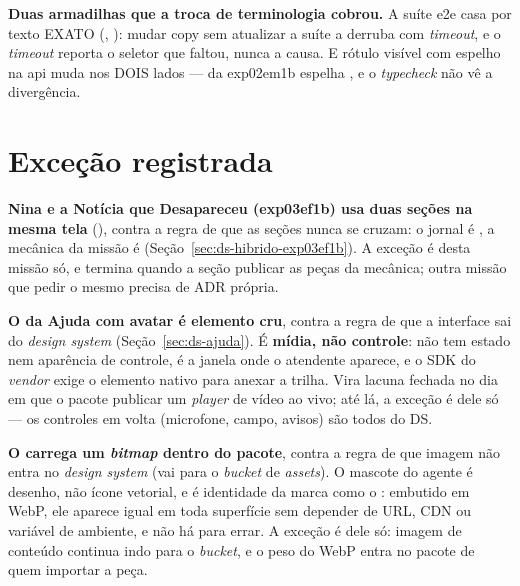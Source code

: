 \textbf{Duas armadilhas que a troca de terminologia cobrou.} A suíte e2e casa por
texto EXATO (, ): mudar copy sem atualizar
a suíte a derruba com \emph{timeout}, e o \emph{timeout} reporta o seletor que
faltou, nunca a causa. E rótulo visível com espelho na api muda nos DOIS lados
---  da exp02em1b espelha
, e o \emph{typecheck} não vê a
divergência.

\section{Exceção registrada}

\begin{decisao}
\textbf{Nina e a Notícia que Desapareceu (exp03ef1b) usa duas seções na mesma
tela} (), contra a regra de que as seções nunca se cruzam: o
jornal é , a mecânica da missão é 
(Seção~\ref{sec:ds-hibrido-exp03ef1b}). A exceção é desta missão só, e
termina quando a seção  publicar as peças da mecânica; outra
missão que pedir o mesmo precisa de ADR própria.
\end{decisao}

\begin{decisao}
\textbf{O  da Ajuda com avatar é elemento cru}, contra a regra de
que a interface sai do \emph{design system} (Seção~\ref{sec:ds-ajuda}). É
\textbf{mídia, não controle}: não tem estado nem aparência de controle, é a
janela onde o atendente aparece, e o SDK do \emph{vendor} exige o elemento nativo
para anexar a trilha. Vira lacuna fechada no dia em que o pacote publicar um
\emph{player} de vídeo ao vivo; até lá, a exceção é dele só --- os controles em
volta (microfone, campo, avisos) são todos do DS.
\end{decisao}

\begin{decisao}
\textbf{O  carrega um \emph{bitmap} dentro do pacote}, contra a
regra de que imagem não entra no \emph{design system} (vai para o \emph{bucket} de
\emph{assets}). O mascote do agente é desenho, não ícone vetorial, e é identidade
da marca como o : embutido em WebP, ele aparece igual em toda superfície
sem depender de URL, CDN ou variável de ambiente, e não há  para errar. A
exceção é dele só: imagem de conteúdo continua indo para o \emph{bucket}, e o peso
do WebP entra no pacote de quem importar a peça.
\end{decisao}

